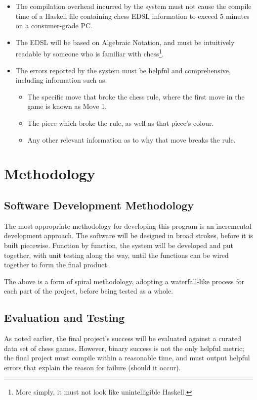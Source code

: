 \documentclass[12pt, a4paper]{scrartcl}
\begin{document}
\begin{itemize}
    \item The compilation overhead incurred by the system must not cause the compile time of a Haskell file containing chess EDSL information to exceed 5 minutes on a consumer-grade PC.
    \item The EDSL will be based on Algebraic Notation, and must be intuitively readable by someone who is familiar with chess\footnote{More simply, it must not look like unintelligible Haskell.}.
    \item The errors reported by the system must be helpful and comprehensive, including information such as:
          \begin{itemize}
              \item The specific move that broke the chess rule, where the first move in the game is known as Move 1.
              \item The piece which broke the rule, as well as that piece's colour.
              \item Any other relevant information as to why that move breaks the rule.
          \end{itemize}
\end{itemize}

\section{Methodology}

\subsection{Software Development Methodology}

The most appropriate methodology for developing this program is an incremental development approach. The software will be designed in broad strokes, before it is built piecewise. Function by function, the system will be developed and put together, with unit testing along the way, until the functions can be wired together to form the final product.

The above is a form of spiral methodology, adopting a waterfall-like process for each part of the project, before being tested as a whole.

\subsection{Evaluation and Testing}

As noted earlier, the final project's success will be evaluated against a curated data set of chess games. However, binary success is not the only helpful metric; the final project must compile within a reasonable time, and must output helpful errors that explain the reason for failure (should it occur).
\end{document}

